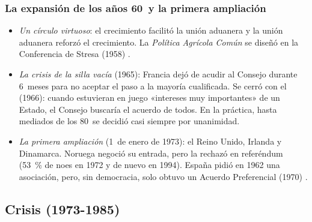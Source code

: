 \documentclass[11pt]{article}
\begin{document}
\subsubsection{La expansión de los años 60~y la primera ampliación}\label{sec:expansion}

\begin{itemize}
\item \emph{Un círculo virtuoso}: el crecimiento facilitó la unión aduanera y la unión aduanera reforzó el crecimiento. La \emph{Política Agrícola Común} se diseñó en la Conferencia de Stresa (1958) .
\item \emph{La crisis de la silla vacía} (1965): Francia dejó de acudir al Consejo durante 6~meses para no aceptar el paso a la mayoría cualificada. Se cerró con el  (1966): cuando estuvieran en juego «intereses muy importantes» de un Estado, el Consejo buscaría el acuerdo de todos. En la práctica, hasta mediados de los 80~se decidió casi siempre por unanimidad.
\item \emph{La primera ampliación} (1~de enero de 1973): el Reino Unido, Irlanda y Dinamarca. Noruega negoció su entrada, pero la rechazó en referéndum (53~\% de noes en 1972 y de nuevo en 1994). España pidió en 1962 una asociación, pero, sin democracia, solo obtuvo un Acuerdo Preferencial (1970) .
\end{itemize}

\subsection{Crisis (1973-1985)}\label{sec:crisis}
\end{document}
